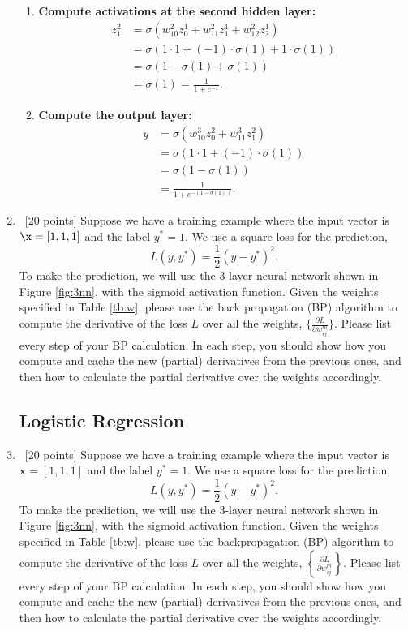 \documentclass[12pt, fullpage,letterpaper]{article}
\begin{document}
\begin{enumerate}
\begin{enumerate}
    \item \textbf{Compute activations at the second hidden layer:}
    \begin{align*}
    z_1^2 &= \sigma(w_{10}^2z_0^1 + w_{11}^2z_1^1 + w_{12}^2z_2^1) \\
    &= \sigma(1 \cdot 1 + (-1) \cdot \sigma(1) + 1 \cdot \sigma(1)) \\
    &= \sigma(1 - \sigma(1) + \sigma(1)) \\
    &= \sigma(1) = \frac{1}{1 + e^{-1}}.
    \end{align*}

    \item \textbf{Compute the output layer:}
    \begin{align*}
    y &= \sigma(w_{10}^3z_0^2 + w_{11}^3z_1^2) \\
    &= \sigma(1 \cdot 1 + (-1) \cdot \sigma(1)) \\
    &= \sigma(1 - \sigma(1)) \\
    &= \frac{1}{1 + e^{-(1 - \sigma(1))}}.
    \end{align*}

\end{enumerate}

	
	\item~[20 points] Suppose we have a training example  where the input vector is $\x = [1,1,1]$ and the label $y^* = 1$. We use a square loss for the prediction, 
	\[
	L(y, y^*) = \frac{1}{2}(y-y^*)^2.
	\]
	To make the prediction, we will use the 3 layer neural network shown in Figure \ref{fig:3nn}, with the sigmoid activation function. Given the weights specified in Table \ref{tb:w}, please use the back propagation (BP) algorithm to compute the derivative of the loss $L$ over all the weights, $\{\frac{\partial L}{\partial w^{m}_{ij}}\}$. Please list every step of your BP calculation. In each step, you should show how you compute and cache the new (partial) derivatives from the previous ones, and then how to calculate the partial derivative over the weights accordingly.  


\subsection*{Logistic Regression}

\item~[20 points] Suppose we have a training example where the input vector is $\mathbf{x} = [1, 1, 1]$ and the label $y^* = 1$. We use a square loss for the prediction,
\[
L(y, y^*) = \frac{1}{2}(y - y^*)^2.
\]
To make the prediction, we will use the 3-layer neural network shown in Figure \ref{fig:3nn}, with the sigmoid activation function. Given the weights specified in Table \ref{tb:w}, please use the backpropagation (BP) algorithm to compute the derivative of the loss $L$ over all the weights, $\left\{\frac{\partial L}{\partial w^{m}_{ij}}\right\}$. Please list every step of your BP calculation. In each step, you should show how you compute and cache the new (partial) derivatives from the previous ones, and then how to calculate the partial derivative over the weights accordingly.



\end{enumerate}
\end{document}
